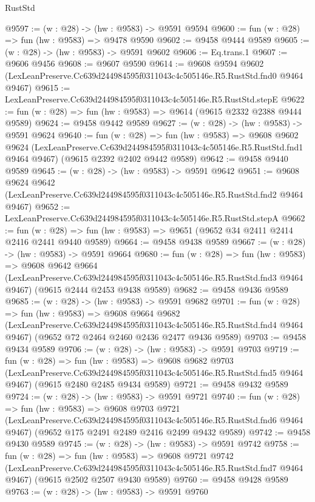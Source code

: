\begin{lexlean}{RustStd}
\begin{coremodule}
@9597 := (w : @28) -> (hw : @9583) -> @9591 @9594
@9600 := fun (w : @28) => fun (hw : @9583) => @9478 @9590
@9602 := @9458 @9444 @9589
@9605 := (w : @28) -> (hw : @9583) -> @9591 @9602
@9606 := Eq.trans.{1}
@9607 := @9606 @9456
@9608 := @9607 @9590
@9614 := @9608
    @9594
    @9602
    (LexLeanPreserve.Cc639d244984595f0311043c4c505146e.R5.RustStd.fnd0 @9464 @9467)
@9615 := LexLeanPreserve.Cc639d244984595f0311043c4c505146e.R5.RustStd.stepE
@9622 := fun (w : @28) => fun (hw : @9583) => @9614 (@9615 @2332 @2388 @9444 @9589)
@9624 := @9458 @9442 @9589
@9627 := (w : @28) -> (hw : @9583) -> @9591 @9624
@9640 := fun (w : @28) =>
  fun (hw : @9583) =>
  @9608
    @9602
    @9624
    (LexLeanPreserve.Cc639d244984595f0311043c4c505146e.R5.RustStd.fnd1 @9464 @9467)
    (@9615 @2392 @2402 @9442 @9589)
@9642 := @9458 @9440 @9589
@9645 := (w : @28) -> (hw : @9583) -> @9591 @9642
@9651 := @9608
    @9624
    @9642
    (LexLeanPreserve.Cc639d244984595f0311043c4c505146e.R5.RustStd.fnd2 @9464 @9467)
@9652 := LexLeanPreserve.Cc639d244984595f0311043c4c505146e.R5.RustStd.stepA
@9662 := fun (w : @28) => fun (hw : @9583) => @9651 (@9652 @34 @2411 @2414 @2416 @2441 @9440 @9589)
@9664 := @9458 @9438 @9589
@9667 := (w : @28) -> (hw : @9583) -> @9591 @9664
@9680 := fun (w : @28) =>
  fun (hw : @9583) =>
  @9608
    @9642
    @9664
    (LexLeanPreserve.Cc639d244984595f0311043c4c505146e.R5.RustStd.fnd3 @9464 @9467)
    (@9615 @2444 @2453 @9438 @9589)
@9682 := @9458 @9436 @9589
@9685 := (w : @28) -> (hw : @9583) -> @9591 @9682
@9701 := fun (w : @28) =>
  fun (hw : @9583) =>
  @9608
    @9664
    @9682
    (LexLeanPreserve.Cc639d244984595f0311043c4c505146e.R5.RustStd.fnd4 @9464 @9467)
    (@9652 @72 @2464 @2460 @2436 @2477 @9436 @9589)
@9703 := @9458 @9434 @9589
@9706 := (w : @28) -> (hw : @9583) -> @9591 @9703
@9719 := fun (w : @28) =>
  fun (hw : @9583) =>
  @9608
    @9682
    @9703
    (LexLeanPreserve.Cc639d244984595f0311043c4c505146e.R5.RustStd.fnd5 @9464 @9467)
    (@9615 @2480 @2485 @9434 @9589)
@9721 := @9458 @9432 @9589
@9724 := (w : @28) -> (hw : @9583) -> @9591 @9721
@9740 := fun (w : @28) =>
  fun (hw : @9583) =>
  @9608
    @9703
    @9721
    (LexLeanPreserve.Cc639d244984595f0311043c4c505146e.R5.RustStd.fnd6 @9464 @9467)
    (@9652 @175 @2491 @2489 @2416 @2499 @9432 @9589)
@9742 := @9458 @9430 @9589
@9745 := (w : @28) -> (hw : @9583) -> @9591 @9742
@9758 := fun (w : @28) =>
  fun (hw : @9583) =>
  @9608
    @9721
    @9742
    (LexLeanPreserve.Cc639d244984595f0311043c4c505146e.R5.RustStd.fnd7 @9464 @9467)
    (@9615 @2502 @2507 @9430 @9589)
@9760 := @9458 @9428 @9589
@9763 := (w : @28) -> (hw : @9583) -> @9591 @9760

\end{coremodule}
\end{lexlean}

